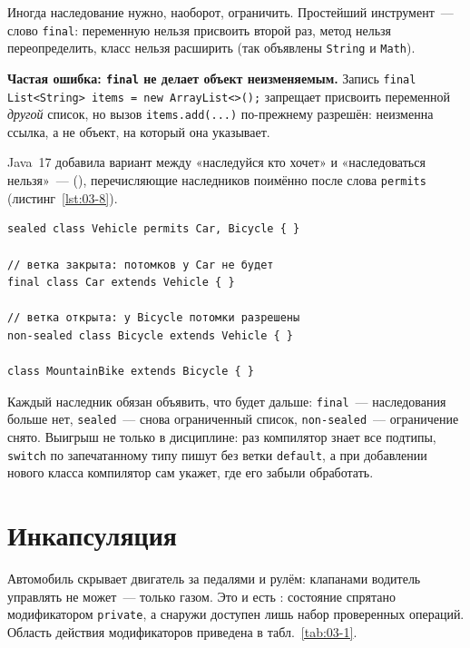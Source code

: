 Иногда наследование нужно, наоборот, ограничить. Простейший инструмент~--- слово
\texttt{final}: переменную нельзя присвоить второй раз, метод нельзя
переопределить, класс нельзя расширить (так объявлены \texttt{String} и
\texttt{Math}).

\begin{oshibka}
\textbf{Частая ошибка: \texttt{final} не делает объект неизменяемым.} Запись
\texttt{final List<String> items = new ArrayList<>();} запрещает присвоить
переменной \emph{другой} список, но вызов \texttt{items.add(...)} по-прежнему
разрешён: неизменна ссылка, а не объект, на который она указывает.
\end{oshibka}

Java~17 добавила вариант между «наследуйся кто хочет» и «наследоваться
нельзя»~---  (), перечисляющие
наследников поимённо после слова \texttt{permits} (листинг~\ref{lst:03-8}).

\begin{listing}[H]
\begin{verbatim}
sealed class Vehicle permits Car, Bicycle { }

// ветка закрыта: потомков у Car не будет
final class Car extends Vehicle { }

// ветка открыта: у Bicycle потомки разрешены
non-sealed class Bicycle extends Vehicle { }

class MountainBike extends Bicycle { }
\end{verbatim}
\caption{Запечатанный класс и его наследники}
\label{lst:03-8}
\end{listing}

Каждый наследник обязан объявить, что будет дальше: \texttt{final}~---
наследования больше нет, \texttt{sealed}~--- снова ограниченный список,
\texttt{non-sealed}~--- ограничение снято. Выигрыш не только в дисциплине: раз
компилятор знает все подтипы, \texttt{switch} по запечатанному типу пишут без
ветки \texttt{default}, а при добавлении нового класса компилятор сам укажет,
где его забыли обработать.

\section{Инкапсуляция}

Автомобиль скрывает двигатель за педалями и рулём: клапанами водитель управлять
не может~--- только газом. Это и есть : состояние спрятано
модификатором \texttt{private}, а снаружи доступен лишь набор проверенных
операций. Область действия модификаторов приведена в табл.~\ref{tab:03-1}.

